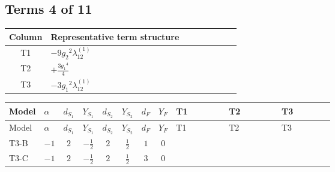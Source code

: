 \documentclass[8pt]{article}
\begin{document}
\begin{landscape}
\subsection*{Terms 4 of 11}
\begin{center}
\begin{tabular}{@{}c >{\raggedright\arraybackslash}p{0.82\linewidth}@{}}
\toprule
Column & Representative term structure \\
\midrule
T1 & \(\displaystyle -9 {g_2}^2 {\lambda_{12}^{(1)}}\) \\
\midrule
T2 & \(\displaystyle +\frac{3 {g_1}^4}{4}\) \\
\midrule
T3 & \(\displaystyle -3 {g_1}^2 {\lambda_{12}^{(1)}}\) \\
\midrule
\bottomrule
\end{tabular}
\end{center}
\smallskip
\tiny
\begin{longtable}{@{}llcccccc >{\raggedright\arraybackslash}p{0.21\linewidth} >{\raggedright\arraybackslash}p{0.21\linewidth} >{\raggedright\arraybackslash}p{0.21\linewidth}@{}}
\toprule
Model & $\alpha$ & $d_{S_1}$ & $Y_{S_1}$ & $d_{S_2}$ & $Y_{S_2}$ & $d_F$ & $Y_F$ & T1 & T2 & T3 \\
\midrule
\endfirsthead
\toprule
Model & $\alpha$ & $d_{S_1}$ & $Y_{S_1}$ & $d_{S_2}$ & $Y_{S_2}$ & $d_F$ & $Y_F$ & T1 & T2 & T3 \\
\midrule
\endhead
T3-B & $-1$ & $2$ & $-\frac{1}{2}$ & $2$ & $\frac{1}{2}$ & $1$ & $0$ & \scriptsize\adjustbox{max width=\linewidth}{$\begin{gathered} -9 {g_2}^2 {\lambda_{12}^{(1)}}\end{gathered}$} & \scriptsize\adjustbox{max width=\linewidth}{$\begin{gathered} +\frac{3 {g_1}^4}{4}\end{gathered}$} & \scriptsize\adjustbox{max width=\linewidth}{$\begin{gathered} -3 {g_1}^2 {\lambda_{12}^{(1)}}\end{gathered}$} \\
\midrule
T3-C & $-1$ & $2$ & $-\frac{1}{2}$ & $2$ & $\frac{1}{2}$ & $3$ & $0$ & \scriptsize\adjustbox{max width=\linewidth}{$\begin{gathered} -9 {g_2}^2 {\lambda_{12}^{(1)}}\end{gathered}$} & \scriptsize\adjustbox{max width=\linewidth}{$\begin{gathered} +\frac{3 {g_1}^4}{4}\end{gathered}$} & \scriptsize\adjustbox{max width=\linewidth}{$\begin{gathered} -3 {g_1}^2 {\lambda_{12}^{(1)}}\end{gathered}$} \\

\end{longtable}
\end{landscape}
\end{document}
